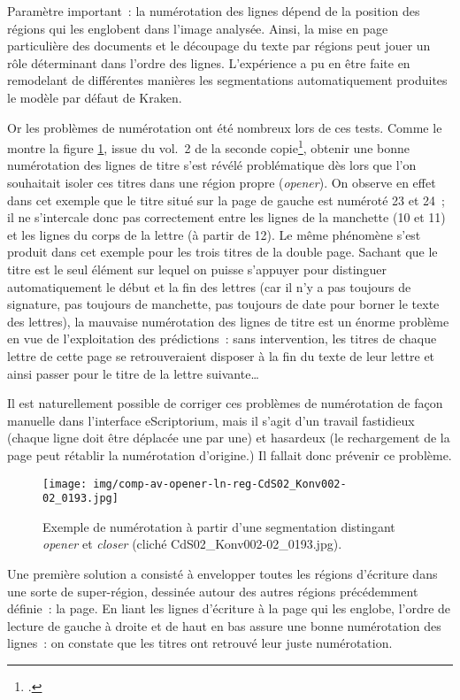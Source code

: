 \documentclass[a4paper,12pt,twoside]{book}
\begin{document}
				Paramètre important~: la numérotation des lignes dépend de la position des régions qui les englobent dans l'image analysée. Ainsi, la mise en page particulière des documents et le découpage du texte par régions peut jouer un rôle déterminant dans l'ordre des lignes. L'expérience a pu en être faite en remodelant de différentes manières les segmentations automatiquement produites le modèle par défaut de Kraken.
				
				Or les problèmes de numérotation ont été nombreux lors de ces tests. Comme le montre la figure \ref{comp-av-opener-ln-reg-193}, issue du vol.~2 de la seconde copie\footcite{CdS02001369}, obtenir une bonne numérotation des lignes de titre s'est révélé problématique dès lors que l'on souhaitait isoler ces titres dans une région propre (\textit{opener}). On observe en effet dans cet exemple que le titre situé sur la page de gauche est numéroté 23 et 24~; il ne s'intercale donc pas correctement entre les lignes de la manchette (10 et 11) et les lignes du corps de la lettre (à partir de 12). Le même phénomène s'est produit dans cet exemple pour les trois titres de la double page. Sachant que le titre est le seul élément sur lequel on puisse s'appuyer pour distinguer automatiquement le début et la fin des lettres (car il n'y a pas toujours de signature, pas toujours de manchette, pas toujours de date pour borner le texte des lettres), la mauvaise numérotation des lignes de titre est un énorme problème en vue de l'exploitation des prédictions~: sans intervention, les titres de chaque lettre de cette page se retrouveraient disposer à la fin du texte de leur lettre et ainsi passer pour le titre de la lettre suivante…
				
				Il est naturellement possible de corriger ces problèmes de numérotation de façon manuelle dans l'interface eScriptorium, mais il s'agit d'un travail fastidieux (chaque ligne doit être déplacée une par une) et hasardeux (le rechargement de la page peut rétablir la  numérotation d'origine.) Il fallait donc prévenir ce problème.
				
				\begin{figure}[!h]
					\centering
					\texttt{[image: img/comp-av-opener-ln-reg-CdS02\_Konv002-02\_0193.jpg]}
					\caption{Exemple de numérotation à partir d'une segmentation distingant \textit{opener} et \textit{closer} (cliché CdS02\_Konv002-02\_0193.jpg).}
					\label{comp-av-opener-ln-reg-193}
				\end{figure}
			
				Une première solution a consisté à envelopper toutes les régions d'écriture dans une sorte de super-région, dessinée autour des autres régions précédemment définie~: la page. En liant les lignes d'écriture à la page qui les englobe, l'ordre de lecture de gauche à droite et de haut en bas assure une bonne numérotation des lignes~: on constate que les titres ont retrouvé leur juste numérotation.
				
\end{document}
